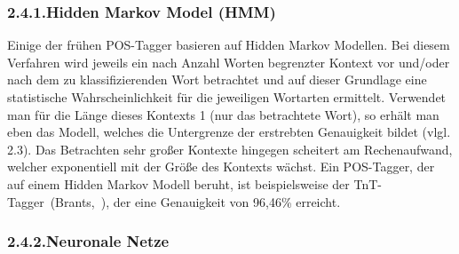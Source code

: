 \documentclass{article}
\begin{document}
\subsubsection{2.4.1.\hspace*{0.5em}Hidden Markov Model (HMM)}\label{sec-hidden-markov-model-hmm}%

\noindent{}Einige der frühen POS-Tagger basieren auf Hidden Markov Modellen. Bei diesem Verfahren wird jeweils ein nach Anzahl Worten begrenzter Kontext vor und/oder nach dem zu klassifizierenden Wort betrachtet und auf dieser Grundlage eine statistische Wahrscheinlichkeit für die jeweiligen Wortarten ermittelt. Verwendet man für die Länge dieses Kontexts 1 (nur das betrachtete Wort), so erhält man eben das Modell, welches die Untergrenze der erstrebten Genauigkeit bildet (vlgl. 2.3). Das Betrachten sehr großer Kontexte hingegen scheitert am Rechenaufwand, welcher exponentiell mit der Größe des Kontexts wächst.
Ein POS-Tagger, der auf einem Hidden Markov Modell beruht, ist beispielsweise der TnT-Tagger~(Brants,~), der eine Genauigkeit von 96,46\% erreicht.%

\subsubsection{2.4.2.\hspace*{0.5em}Neuronale Netze}\label{sec-neuronale-netze}%
\end{document}
